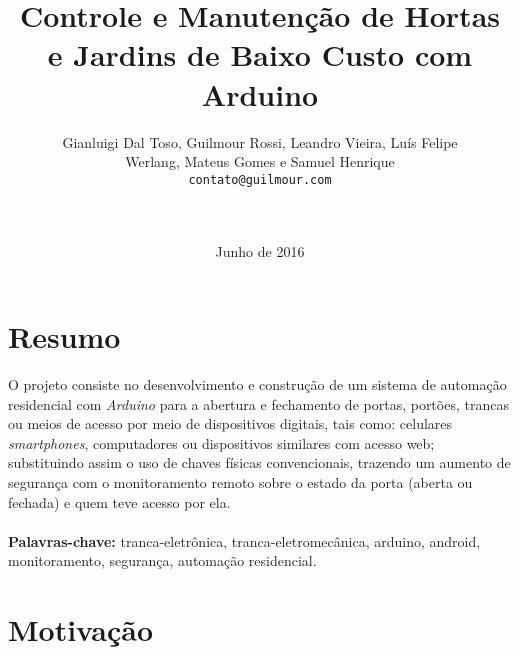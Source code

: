 \documentclass[a4paper,12pt]{article}
\begin{document}
\title{Controle e Manutenção de Hortas e Jardins de Baixo Custo com Arduino}
\author{Gianluigi Dal Toso, Guilmour Rossi, Leandro Vieira, Luís Felipe\\Werlang, Mateus Gomes e Samuel Henrique\\\texttt{contato@guilmour.com}\\\\\\
}

\date{Junho de 2016}

\maketitle




\newpage


\tableofcontents


\newpage


\section{Resumo}
  O projeto consiste no desenvolvimento e construção de um sistema de automação residencial com \textit{Arduino} para a abertura e fechamento de portas, portões, trancas ou meios de acesso por meio de dispositivos digitais, tais como: celulares \textit{smartphones}, computadores ou dispositivos similares com acesso web; substituindo assim o uso de chaves físicas convencionais, trazendo um aumento de segurança com o monitoramento remoto sobre o estado da porta (aberta ou fechada) e quem teve acesso por ela.
  \textbf{\\\\Palavras-chave:} tranca-eletrônica, tranca-eletromecânica, arduino, android, monitoramento, segurança, automação residencial.


\newpage

\section{Motivação}
\end{document}
